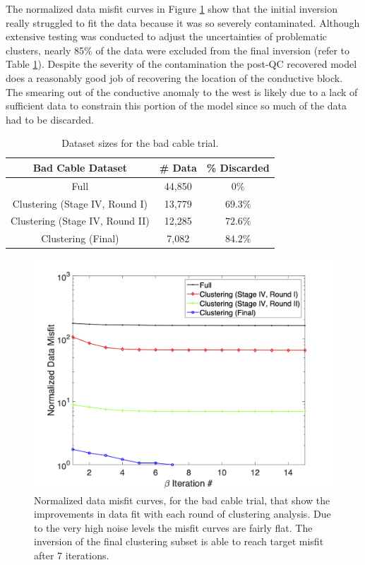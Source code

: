\documentclass[final,authoryear,5p,times,twocolumn]{elsarticle}
\begin{document}
The normalized data misfit curves in Figure \ref{fig:Synth_Horseshoe_BadCable_MisfitPlots} show that the initial inversion really struggled to fit the data because it was so severely contaminated. Although extensive testing was conducted to adjust the uncertainties of problematic clusters, nearly 85\% of the data were excluded from the final inversion (refer to Table \ref{tab:Synth_BadCable_Sizes}). Despite the severity of the contamination the post-QC recovered model does a reasonably good job of recovering the location of the conductive block. The smearing out of the conductive anomaly to the west is likely due to a lack of sufficient data to constrain this portion of the model since so much of the data had to be discarded.

\begin{table}[!ht]
\small
\begin{center}
  \begin{tabular}{| c | c | c |}
    \hline
    \bf{Bad Cable Dataset} & \bf{\# Data} & \bf{\% Discarded}\\
    \hline
    Full & 44,850 & $0 \%$\\
    \hline
    Clustering (Stage IV, Round I) &  13,779 & $69.3 \%$\\
    \hline
    Clustering (Stage IV, Round II) & 12,285 & $72.6 \%$\\
    \hline
    Clustering (Final) & 7,082 & $84.2 \%$\\
    \hline
  \end{tabular}
\caption{Dataset sizes for the bad cable trial.}
\label{tab:Synth_BadCable_Sizes}
\end{center}
\end{table}

\begin{figure} [!ht]
	\begin{center}
	\includegraphics[trim=1.3cm 0.2cm 2.6cm 1.2cm, clip=true,width=0.75\linewidth]{./Figures/Fig24.png}
	\end{center}
\caption{Normalized data misfit curves, for the bad cable trial, that show the improvements in data fit with each round of clustering analysis. Due to the very high noise levels the misfit curves are fairly flat. The inversion of the final clustering subset is able to reach target misfit after 7 iterations.}
\label{fig:Synth_Horseshoe_BadCable_MisfitPlots}
\end{figure}
\end{document}

